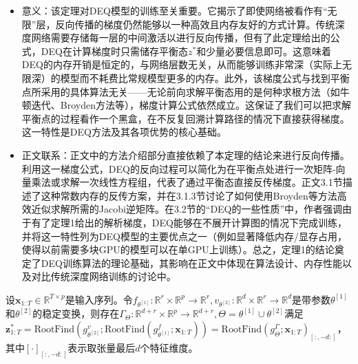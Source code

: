 \documentclass[cn,hazy,cyan,11pt,normal]{elegantnote}
\begin{document}
    \begin{itemize}
        \item 意义：该定理对DEQ模型的训练至关重要。它揭示了即使网络被看作有“无限”层，反向传播的梯度仍然能够以一种高效且内存友好的方式计算。传统深度网络需要存储每一层的中间激活以进行反向传播，但有了此定理给出的公式，DEQ在计算梯度时只需储存平衡态$z^*$和少量必要信息即可。这意味着DEQ的内存开销是恒定的，与网络层数无关，从而能够训练非常深（实际上无限深）的模型而不耗费比常规模型更多的内存。此外，该梯度公式与找到平衡点所采用的具体算法无关——无论前向求解平衡态用的是何种求根方法（如牛顿迭代、Broyden方法等），梯度计算公式依然成立。这保证了我们可以把求解平衡点的过程看作一个黑盒，在不反复回溯计算路径的情况下直接获得梯度。这一特性是DEQ方法及其各项优势的核心基础。
        \item 正文联系：正文中的方法介绍部分直接依赖了本定理的结论来进行反向传播。利用这一梯度公式，DEQ的反向过程可以简化为在平衡点处进行一次矩阵-向量乘法或求解一次线性方程组，代表了通过平衡态直接反传梯度。正文3.1节描述了这种常数内存的反传方案，并在3.1.3节讨论了如何使用Broyden等方法高效近似求解所需的Jacobi逆矩阵。在3.2节的“DEQ的一些性质”中，作者强调由于有了定理1给出的解析梯度，DEQ能够在不展开计算图的情况下完成训练，并将这一特性列为DEQ模型的主要优点之一（例如显著降低内存/显存占用，使得以前需要多块GPU的模型可以在单GPU上训练）。总之，定理1的结论奠定了DEQ训练算法的理论基础，其影响在正文中体现在算法设计、内存性能以及对比传统深度网络训练的讨论中。
    \end{itemize}

    \begin{theorem}[单层DEQ的通用性]
        设$\mathbf{x}_{1:T}\in\mathbb{R}^{T\times p}$是输入序列。令$f_{\theta^{[1]}}:\mathbb{R}^{r}\times\mathbb{R}^{p}\rightarrow\mathbb{R}^{r},v_{\theta^{[2]}}:\mathbb{R}^{d}\times\mathbb{R}^{r}\rightarrow\mathbb{R}^{d}$是带参数$\theta^{[1]}$和$\theta^{[2]}$的稳定变换，则存在$\Gamma_{\Theta}:\mathbb{R}^{d+r}\times\mathbb{R}^{p}\rightarrow\mathbb{R}^{d+r},\Theta=\theta^{[1]}\cup\theta^{[2]}$满足$\mathbf{z}_{1:T}^{*}=\text{RootFind}(g_{\theta^{[2]}}^v;\text{RootFind}(g_{\theta^{[1]}}^f;\mathbf{x}_{1:T}))=\text{RootFind}(g_{\Theta}^{\Gamma};\mathbf{x}_{1:T})_{[:,-d:]}$，其中$[\cdot]_{[:,-d:]}$表示取张量最后$d$个特征维度。
    \end{theorem}
\end{document}
